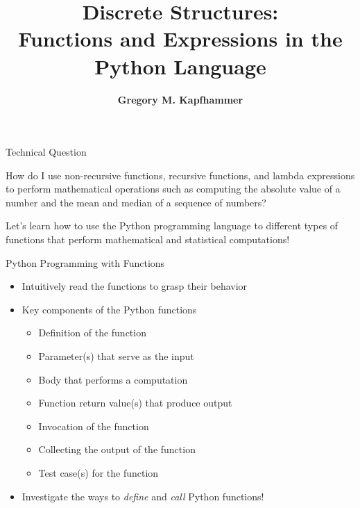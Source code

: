 \documentclass[14pt,aspectratio=169]{beamer}
\title{Discrete Structures: \\ Functions and Expressions in the Python Language}
\author{{\bf Gregory M. Kapfhammer}}
\institute[shortinst]{{\bf Department of Computer Science, Allegheny College}}
\begin{document}
{
  \begin{frame}
    \titlepage
  \end{frame}
}

%
\begin{frame}{Technical Question}
  \begin{center}
    {\large How do I use non-recursive functions, recursive functions, and
    lambda expressions to perform mathematical operations such as computing the
  absolute value of a number and the mean and median of a sequence of numbers?}
  \end{center}
  \vspace{2ex}
  \begin{center}
    \small Let's learn how to use the Python programming language to different
    types of functions that perform mathematical and statistical computations!
  \end{center}
\end{frame}

%
\begin{frame}{Python Programming with Functions}
  \begin{itemize}
    \item Intuitively read the functions to grasp their behavior
      \vspace*{-.15in}
    \item Key components of the Python functions
      \begin{itemize}
        \item Definition of the function
        \item Parameter(s) that serve as the input
        \item Body that performs a computation
        \item Function return value(s) that produce output
        \item Invocation of the function
        \item Collecting the output of the function
        \item Test case(s) for the function
      \end{itemize}
      \vspace*{-.2in}
    \item Investigate the ways to {\em define} and {\em call} Python functions!
  \end{itemize}
\end{frame}
\end{document}
